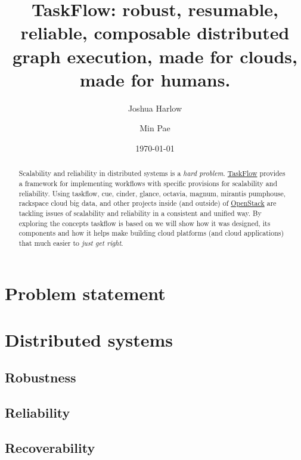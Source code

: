 \documentclass[11pt,a4paper]{article}
\begin{document}
\title{TaskFlow: robust, resumable, reliable, composable distributed graph
       execution, made for clouds, made for humans.}

\date{\today}

\author[1]{Joshua Harlow}
\author[2]{Min Pae}

\maketitle

\begin{abstract}

Scalability and reliability in distributed systems is a \emph{hard problem}.
\href{http://docs.openstack.org/developer/taskflow/}{TaskFlow} provides
a framework for implementing workflows with specific provisions for scalability
and reliability. Using taskflow, cue, cinder, glance, octavia, magnum,
mirantis pumphouse, rackspace cloud big data, and other projects inside (and
outside) of \href{http://www.openstack.org/}{OpenStack} are tackling issues of
scalability and reliability in a consistent and unified way. By exploring
the concepts taskflow is based on we will show how it was designed, its
components and how it helps make building cloud platforms (and cloud
applications) that much easier to \emph{just get right}.

\end{abstract}

\section{Problem statement}

\section{Distributed systems}

\subsection{Robustness}

\subsection{Reliability}

\subsection{Recoverability}
\end{document}
